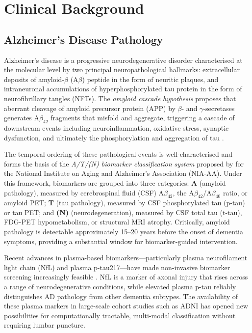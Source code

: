 \documentclass[12pt, a4paper]{report}
\begin{document}
  \chapter{Clinical Background}
  \label{chap:clinical-background}

  \section{Alzheimer's Disease Pathology}
  \label{sec:ad-pathology}

  Alzheimer's disease is a progressive neurodegenerative disorder characterised at
  the molecular level by two principal neuropathological hallmarks: extracellular
  deposits of amyloid-$\beta$ (A$\beta$) peptide in the form of neuritic plaques, and
  intraneuronal accumulations of hyperphosphorylated tau protein in the form of
  neurofibrillary tangles (NFTs). The \emph{amyloid cascade hypothesis} proposes that
  aberrant cleavage of amyloid precursor protein (APP) by $\beta$- and
  $\gamma$-secretases generates A$\beta_{42}$ fragments that misfold and aggregate,
  triggering a cascade of downstream events including neuroinflammation, oxidative
  stress, synaptic dysfunction, and ultimately the phosphorylation and aggregation of
  tau \citep{mckhann2011diagnosis}.

  The temporal ordering of these pathological events is well-characterised and forms
  the basis of the \emph{A/T/(N) biomarker classification system} proposed by
  \citet{jack2018nia} for the National Institute on Aging and Alzheimer's Association
  (NIA-AA). Under this framework, biomarkers are grouped into three categories:
  \textbf{A} (amyloid pathology), measured by cerebrospinal fluid (CSF)
  A$\beta_{42}$, the A$\beta_{42}$/A$\beta_{40}$ ratio, or amyloid PET; \textbf{T}
  (tau pathology), measured by CSF phosphorylated tau (p-tau) or tau PET; and
  \textbf{(N)} (neurodegeneration), measured by CSF total tau (t-tau), FDG-PET
  hypometabolism, or structural MRI atrophy. Critically, amyloid pathology is
  detectable approximately 15--20 years before the onset of dementia symptoms,
  providing a substantial window for biomarker-guided intervention.

  Recent advances in plasma-based biomarkers---particularly plasma
  neurofilament light chain (NfL) and plasma p-tau217---have made non-invasive
  biomarker screening increasingly feasible \citep{zetterberg2021plasma}. NfL is a
  marker of axonal injury that rises across a range of neurodegenerative conditions,
  while elevated plasma p-tau reliably distinguishes AD pathology from other
  dementia subtypes. The availability of these plasma markers in large-scale cohort
  studies such as ADNI has opened new possibilities for computationally tractable,
  multi-modal classification without requiring lumbar puncture.
\end{document}
